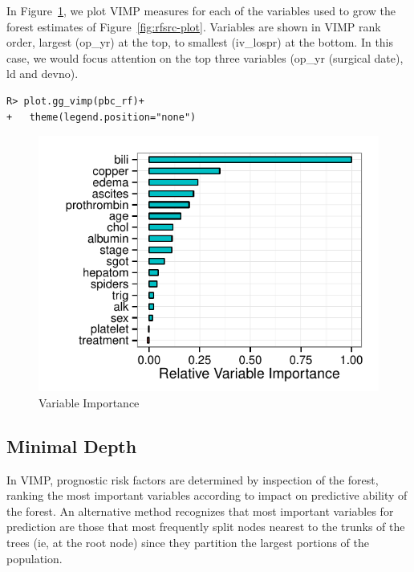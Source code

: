 \documentclass[nojss]{jss}
\begin{document}
In Figure~\ref{fig:rf-vimp}, we plot VIMP measures for each of the variables used to grow the forest estimates of Figure~\ref{fig:rfsrc-plot}. Variables are shown in VIMP rank order, largest (op\_yr) at the top, to smallest (iv\_lospr) at the bottom. In this case, we would focus attention on the top three variables (op\_yr (surgical date), ld and devno).
\begin{knitrout}\footnotesize
{}\color{fgcolor}\begin{kframe}
\begin{verbatim}
R> plot.gg_vimp(pbc_rf)+
+   theme(legend.position="none")
\end{verbatim}
\end{kframe}\begin{figure}[!htpb]

{\centering \includegraphics[width=\maxwidth]{figure/rfs-rf-vimp-1} 

}

\caption[Variable Importance]{Variable Importance\label{fig:rf-vimp}}
\end{figure}


\end{knitrout}

\subsection{Minimal Depth}\label{S:minimalDepth}
In VIMP, prognostic risk factors are determined by inspection of the forest, ranking the most important variables according to impact on predictive ability of the forest. An alternative method recognizes that most important variables for prediction are those that most frequently split nodes nearest to the trunks of the trees (ie, at the root node) since they partition the largest portions of the population. 
\end{document}
